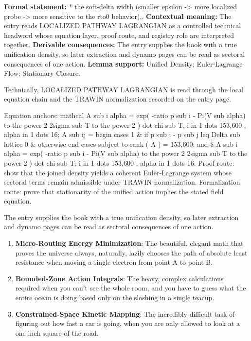 \begingroup\footnotesize\setlength{\emergencystretch}{3em}\sloppy
\textbf{Formal statement:} * the soft-delta width (smaller epsilon -> more localized probe -> more sensitive to the rto0 behavior),. \textbf{Contextual meaning:} The entry reads LOCALIZED PATHWAY LAGRANGIAN as a controlled technical headword whose equation layer, proof route, and registry role are interpreted together. \textbf{Derivable consequences:} The entry supplies the book with a true unification density, so later extraction and dynamo pages can be read as sectoral consequences of one action. \textbf{Lemma support:} Unified Density; Euler-Lagrange Flow; Stationary Closure.\par
\endgroup

Technically, LOCALIZED PATHWAY LAGRANGIAN is read through the local equation chain and the TRAWIN normalization recorded on the entry page.

Equation anchors: mathcal A sub i alpha = exp( -ratio p sub i - Pi(V sub alpha) to the power 2 2sigma sub T to the power 2 ) dot chi sub T, i in 1 dots 153,600 , alpha in 1 dots 16; A sub ij = begin cases 1 \& if p sub i - p sub j leq Delta sub lattice 0 \& otherwise end cases subject to rank ( A ) = 153,600; and \$ A sub i alpha = exp( -ratio p sub i - Pi(V sub alpha) to the power 2 2sigma sub T to the power 2 ) dot chi sub T, i in 1 dots 153,600 , alpha in 1 dots 16. Proof route: show that the joined density yields a coherent Euler-Lagrange system whose sectoral terms remain admissible under TRAWIN normalization. Formalization route: prove that stationarity of the unified action implies the stated field equation.

The entry supplies the book with a true unification density, so later extraction and dynamo pages can be read as sectoral consequences of one action.
\endgroup

\begin{enumerate}[leftmargin=1.6em,itemsep=6pt,topsep=4pt]
\item \textbf{Micro-Routing Energy Minimization}: The beautiful, elegant math that proves the universe always, naturally, lazily chooses the path of absolute least resistance when moving a single electron from point A to point B.
\item \textbf{Bounded-Zone Action Integrals}: The heavy, complex calculations required when you can't see the whole room, and you have to guess what the entire ocean is doing based only on the sloshing in a single teacup.
\item \textbf{Constrained-Space Kinetic Mapping}: The incredibly difficult task of figuring out how fast a car is going, when you are only allowed to look at a one-inch square of the road.
\end{enumerate}

